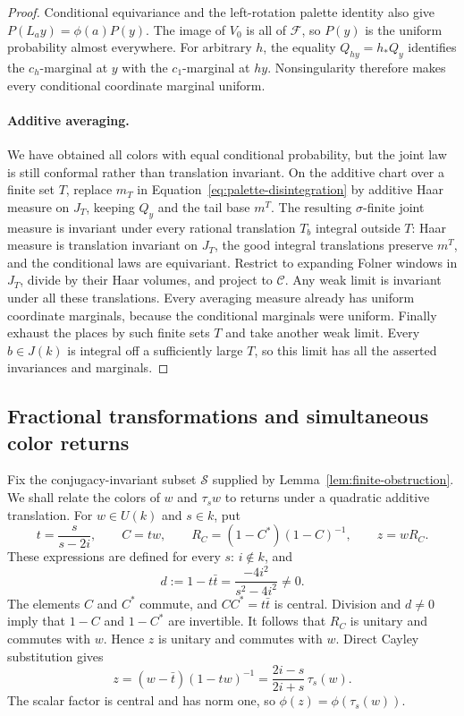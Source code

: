 \begin{proof}
Conditional equivariance and the left-rotation palette identity also give
$P(L_a y)=\phi(a)P(y)$. The image of $V_0$ is all of
$\mathcal F$, so $P(y)$ is the uniform probability almost everywhere.
For arbitrary $h$, the equality $Q_{hy}=h_*Q_y$ identifies the
$c_h$-marginal at $y$ with the $c_1$-marginal at $hy$. Nonsingularity
therefore makes every conditional coordinate marginal uniform.

\paragraph{Additive averaging.}
We have obtained all colors with equal conditional probability, but
the joint law is still conformal rather than translation invariant.
On the additive chart over a finite set $T$, replace $m_T$ in
Equation~\ref{eq:palette-disintegration} by additive Haar measure on
$J_T$, keeping $Q_y$ and the tail base $m^T$. The resulting
$\sigma$-finite joint measure is invariant under every rational
translation $T_b$ integral outside $T$: Haar measure is translation
invariant on $J_T$, the good integral translations preserve $m^T$, and
the conditional laws are equivariant.
Restrict to expanding Folner windows in $J_T$, divide by their Haar
volumes, and project to $\mathcal C$. Any weak limit is invariant under
all these translations. Every averaging measure already has uniform
coordinate marginals, because the conditional marginals were uniform.
Finally exhaust the places by such finite sets $T$ and take another
weak limit. Every $b\in J(k)$ is integral off a sufficiently large
$T$, so this limit has all the asserted invariances and marginals.
\end{proof}

\subsection{Fractional transformations and simultaneous color returns}

Fix the conjugacy-invariant subset $\mathcal S$ supplied by
Lemma~\ref{lem:finite-obstruction}. We shall relate the colors of $w$ and
$\tau_s w$ to returns under a quadratic additive translation.
For $w\in U(k)$ and $s\in k$, put
\begin{equation}\label{eq:palette-boost-data}
 t=\frac{s}{s-2i},\qquad C=tw,\qquad
 R_C=(1-C^*)(1-C)^{-1},\qquad z=wR_C.
\end{equation}
These expressions are defined for every $s$: $i\notin k$, and
\[
 d:=1-t\bar t=\frac{-4i^2}{s^2-4i^2}\ne0.
\]
The elements $C$ and $C^*$ commute, and $CC^*=t\bar t$ is central.
Division and $d\ne0$ imply that $1-C$ and $1-C^*$ are invertible.
It follows that $R_C$ is unitary and commutes with $w$. Hence $z$ is
unitary and commutes with $w$. Direct Cayley substitution gives
\begin{equation}\label{eq:palette-z-color}
 z=(w-\bar t)(1-tw)^{-1}
   =\frac{2i-s}{2i+s}\,\tau_s(w).
\end{equation}
The scalar factor is central and has norm one, so
$\phi(z)=\phi(\tau_s(w))$.

